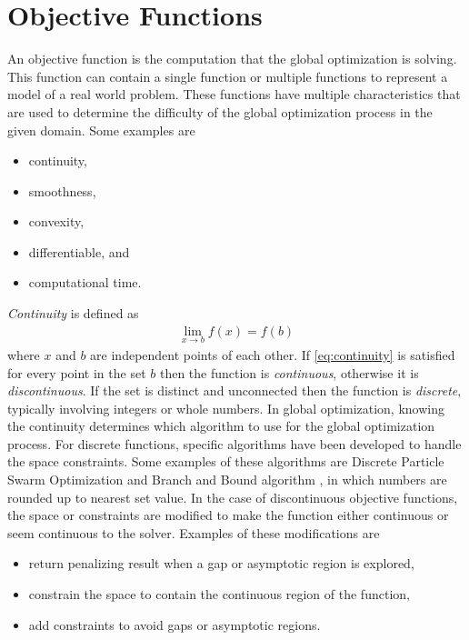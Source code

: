 \section{Objective Functions}
An objective function is the computation that the global optimization is solving. This function can contain a single function or multiple functions to represent a model of a real world problem. These functions have multiple characteristics that are used to determine the difficulty of the global optimization process in the given domain. Some examples are
\begin{itemize}
  \item continuity,
  \item smoothness,
  \item convexity,
  \item differentiable, and
  \item computational time.
\end{itemize}
\textit{Continuity} is defined as  
\begin{align}
  \label{eq:continuity}
  \lim_{x\rightarrow b} f(x) = f(b)
\end{align}
where $x$ and $b$ are independent points of each other. If \eqref{eq:continuity} is satisfied for every point in the set $b$ then the function is \textit{continuous}, otherwise it is \textit{discontinuous}. If the set is distinct and unconnected then the function is \textit{discrete}, typically involving integers or whole numbers. In global optimization, knowing the continuity determines which algorithm to use for the global optimization process. For discrete functions,
specific algorithms have been developed to handle the space constraints. Some examples of these algorithms are Discrete Particle Swarm Optimization \cite{Kaveh2014} and Branch and Bound algorithm \cite{Liberti2000}, in which numbers are rounded up to nearest set value. In the case of discontinuous objective functions, the space or constraints are modified to make the function either continuous or seem continuous to the solver. Examples of these modifications are
\begin{itemize}
    \item return penalizing result when a gap or asymptotic region is explored,
    \item constrain the space to contain the continuous region of the function,
    \item add constraints to avoid gaps or asymptotic regions.
\end{itemize}

